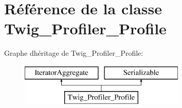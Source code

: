 \hypertarget{class_twig___profiler___profile}{}\section{Référence de la classe Twig\+\_\+\+Profiler\+\_\+\+Profile}
\label{class_twig___profiler___profile}
Graphe d\textquotesingle{}héritage de Twig\+\_\+\+Profiler\+\_\+\+Profile\+:\begin{figure}[H]
\begin{center}
\leavevmode
\includegraphics[height=2.000000cm]{class_twig___profiler___profile}
\end{center}
\end{figure}
